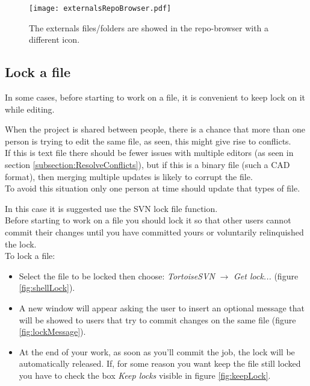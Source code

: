 \begin{figure}[htbp]
    \centering
    \texttt{[image: externalsRepoBrowser.pdf]}
    \caption{The externals files/folders are showed in the repo-browser with a different icon.}
    \label{fig:externalsRepoBrowser}
\end{figure}









\subsection{Lock a file}
\label{subsection:lockFile}

In some cases, before starting to work on a file, it is convenient to keep lock on it while editing.

When the project is shared between people, there is a chance that more than one person is trying to edit the same file, as seen, this might give rise to conflicts.\\

If this is text file there should be fewer issues with multiple editors (as seen in section \ref{subsection:ResolveConflicts}), but if this is a binary file (such a CAD format), then merging multiple updates is likely to corrupt the file.\\


To avoid this situation only one person at time should update that types of file.

In this case it is suggested use the SVN lock file function.\\ 

Before starting to work on a file you should lock it so that other users cannot commit their changes until you have committed yours or voluntarily relinquished the lock.\\

To lock a file:

\begin{itemize}

    \item Select the file to be locked then choose: \textit{TortoiseSVN} $\rightarrow$ \textit{Get lock...} (figure \ref{fig:shellLock}).
    
    \item A new window will appear asking the user to insert an optional message that will be showed to users that try to commit changes on the same file (figure \ref{fig:lockMessage}).
    
    \item At the end of your work, as soon as you'll commit the job, the lock will be automatically released. If, for some reason you want keep the file still locked you have to check the box \textit{Keep locks} visible in figure \ref{fig:keepLock}.
    
\end{itemize}





